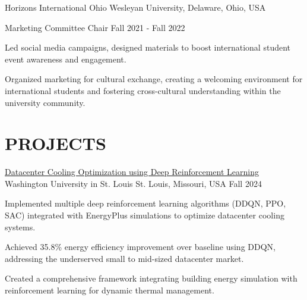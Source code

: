 \documentclass[10pt, letterpaper]{article}
\begin{document}
\begin{leadershipentry}
  {Horizons International} %
  {Ohio Wesleyan University, Delaware, Ohio, USA} %
  \begin{positionentry}
    {Marketing Committee Chair} %
    {Fall 2021 - Fall 2022} %
    \item Led social media campaigns, designed materials to boost international student event awareness and engagement.
    \item Organized marketing for cultural exchange, creating a welcoming environment for international students and fostering cross-cultural understanding within the university community.
  \end{positionentry}
\end{leadershipentry}

\vspace{\headerSpacing}

\section{PROJECTS}

\begin{projectentry}
  {\href{https://github.com/agopalareddy/CSE510A_Datacenter_Cooling}{Datacenter Cooling Optimization using Deep Reinforcement Learning}} %
  {Washington University in St. Louis} %
  {St. Louis, Missouri, USA} %
  {Fall 2024} %
  \item Implemented multiple deep reinforcement learning algorithms (DDQN, PPO, SAC) integrated with EnergyPlus simulations to optimize datacenter cooling systems.
  \item Achieved 35.8\% energy efficiency improvement over baseline using DDQN, addressing the underserved small to mid-sized datacenter market.
  \item Created a comprehensive framework integrating building energy simulation with reinforcement learning for dynamic thermal management.
\end{projectentry}
\end{document}
